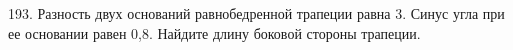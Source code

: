 193. Разность двух оснований равнобедренной трапеции равна 3. Синус угла при ее основании равен 0,8. Найдите длину боковой стороны трапеции.\\
